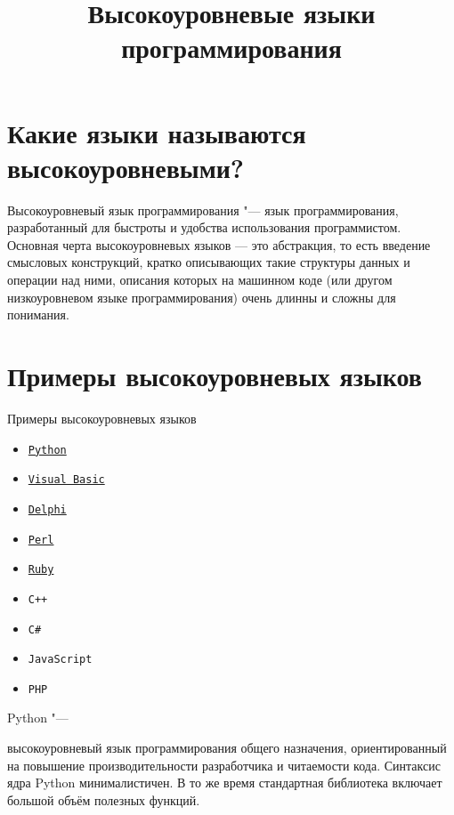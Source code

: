\documentclass[14pt]{beamer}
\title{Высокоуровневые языки программирования}
\date{}
\begin{document}
\begin{frame}[plain]
\titlepage
\end{frame}

{\section{Какие языки называются высокоуровневыми?}
\begin{frame}
\begin{block}{Высокоуровневый язык программирования "---}
язык программирования, разработанный для быстроты и удобства использования программистом. Основная черта высокоуровневых языков — это абстракция, то есть введение смысловых конструкций, кратко описывающих такие структуры данных и операции над ними, описания которых на машинном коде (или другом низкоуровневом языке программирования) очень длинны и сложны для понимания.
\end{block}
\end{frame}
}

{
\section{Примеры высокоуровневых языков}
\begin{frame}[label=menu]
\begin{alertblock}{Примеры высокоуровневых языков}
\begin{itemize}

\item \hyperlink{Python}{\texttt{Python}}
\item \hyperlink{VisualBasic}{\texttt{Visual Basic}}
\item \hyperlink{Delphi}{\texttt{Delphi}}
\item \hyperlink{Perl}{\texttt{Perl}}
\item \hyperlink{Ruby}{\texttt{Ruby}}
\item \texttt{C++}
\item \texttt{C\#}
\item \texttt{JavaScript}
\item \texttt{PHP}

\end{itemize}
\end{alertblock}
\end{frame}
}


\begin{frame}[label=Python]
\begin{block}{Python "---}

высокоуровневый язык программирования общего назначения, ориентированный на повышение производительности разработчика и читаемости кода. Синтаксис ядра Python минималистичен. В то же время стандартная библиотека включает большой объём полезных функций.
\end{block}
\end{frame}
\end{document}
